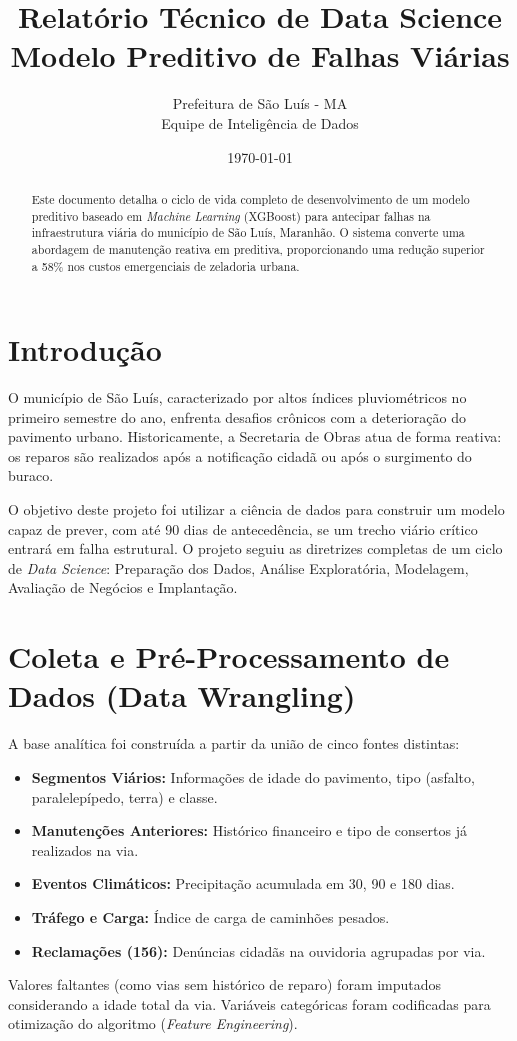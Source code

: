\documentclass[12pt,a4paper]{article}
\title{\textbf{Relatório Técnico de Data Science}\\Modelo Preditivo de Falhas Viárias}
\author{Prefeitura de São Luís - MA \\ Equipe de Inteligência de Dados}
\date{\today}
\begin{document}
\maketitle

\begin{abstract}
Este documento detalha o ciclo de vida completo de desenvolvimento de um modelo preditivo baseado em \textit{Machine Learning} (XGBoost) para antecipar falhas na infraestrutura viária do município de São Luís, Maranhão. O sistema converte uma abordagem de manutenção reativa em preditiva, proporcionando uma redução superior a 58\% nos custos emergenciais de zeladoria urbana.
\end{abstract}

\tableofcontents
\newpage

\section{Introdução}
O município de São Luís, caracterizado por altos índices pluviométricos no primeiro semestre do ano, enfrenta desafios crônicos com a deterioração do pavimento urbano. Historicamente, a Secretaria de Obras atua de forma reativa: os reparos são realizados após a notificação cidadã ou após o surgimento do buraco.

O objetivo deste projeto foi utilizar a ciência de dados para construir um modelo capaz de prever, com até 90 dias de antecedência, se um trecho viário crítico entrará em falha estrutural. O projeto seguiu as diretrizes completas de um ciclo de \textit{Data Science}: Preparação dos Dados, Análise Exploratória, Modelagem, Avaliação de Negócios e Implantação.

\section{Coleta e Pré-Processamento de Dados (Data Wrangling)}
A base analítica foi construída a partir da união de cinco fontes distintas:
\begin{itemize}
    \item \textbf{Segmentos Viários:} Informações de idade do pavimento, tipo (asfalto, paralelepípedo, terra) e classe.
    \item \textbf{Manutenções Anteriores:} Histórico financeiro e tipo de consertos já realizados na via.
    \item \textbf{Eventos Climáticos:} Precipitação acumulada em 30, 90 e 180 dias.
    \item \textbf{Tráfego e Carga:} Índice de carga de caminhões pesados.
    \item \textbf{Reclamações (156):} Denúncias cidadãs na ouvidoria agrupadas por via.
\end{itemize}
Valores faltantes (como vias sem histórico de reparo) foram imputados considerando a idade total da via. Variáveis categóricas foram codificadas para otimização do algoritmo (\textit{Feature Engineering}).
\end{document}
